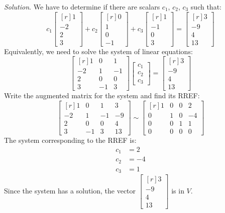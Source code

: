 \documentclass[12pt]{article}
\begin{document}
\emph{Solution}. We have to determine if there are scalars $c_1$, $c_2$, $c_3$ such that:
\[
c_1\left[\begin{matrix*}[r]1\\-2\\2\\3\end{matrix*}\right]+
c_2\left[\begin{matrix*}[r]0\\1\\0\\-1\end{matrix*}\right]+
c_3\left[\begin{matrix*}[r]1\\-1\\0\\3\end{matrix*}\right]
=\left[\begin{matrix*}[r]3\\-9\\4\\13\end{matrix*}\right]
\]
Equivalently, we need to solve the system of linear equations:
\[
\left[\begin{matrix*}[r]1 & 0 & 1\\-2 & 1 & -1\\2 & 0 & 0\\3 & -1 & 3\end{matrix*}\right]
\begin{bmatrix}c_1\\c_2\\c_3\end{bmatrix}=
\left[\begin{matrix*}[r]3\\-9\\4\\13\end{matrix*}\right]
\]
Write the augmented matrix for the system and find its RREF:
\[
\left[\begin{matrix*}[r]1 & 0 & 1 & 3\\-2 & 1 & -1 & -9\\2 & 0 & 0 & 4\\3 & -1 & 3 & 13\end{matrix*}\right]\sim
\left[\begin{matrix*}[r]1 & 0 & 0 & 2\\0 & 1 & 0 & -4\\0 & 0 & 1 & 1\\0 & 0 & 0 & 0\end{matrix*}\right]
\]
The system corresponding to the RREF is:
\begin{align*}
c_1&=2\\
c_2&=-4\\
c_3&=1
\end{align*}
Since the system has a solution, the vector $\left[\begin{matrix*}[r]3\\-9\\4\\13\end{matrix*}\right]$ is in $V$.
\proofend
\end{document}
